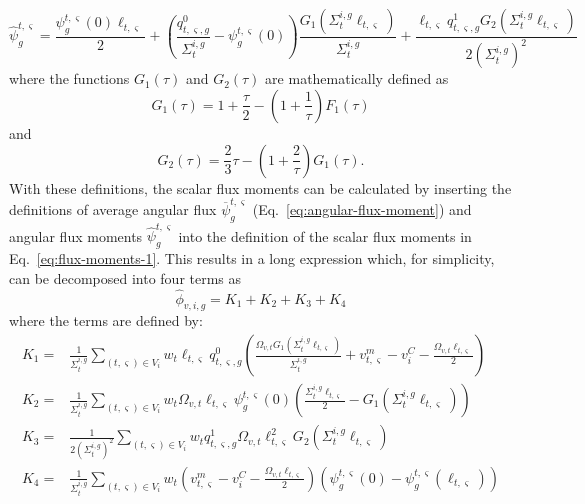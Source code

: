 \begin{equation}
\hat{\psi}^{t,\varsigma}_g = \frac{\psi^{t,\varsigma}_g(0) \ell_{t,\varsigma}}{2} + \left(\frac{q^0_{t,\varsigma,g}}{\Sigma_{t}^{i,g}} - \psi^{t,\varsigma}_g(0) \right) \frac{G_1(\Sigma_{t}^{i,g} \ell_{t,\varsigma})}{\Sigma_{t}^{i,g}} + \frac{\ell_{t,\varsigma} q^1_{t,\varsigma,g} G_2(\Sigma_{t}^{i,g} \ell_{t,\varsigma})}{2\left(\Sigma_{t}^{i,g}\right)^2}
\label{eq:angular-flux-moment}
\end{equation}
where the functions $G_1(\tau)$ and $G_2(\tau)$ are mathematically defined as
\begin{equation}
G_1(\tau) = 1 + \frac{\tau}{2} - \left(1 + \frac{1}{\tau}\right) F_1(\tau)
\end{equation}
and
\begin{equation}
G_2(\tau) = \frac{2}{3} \tau - \left(1 + \frac{2}{\tau}\right) G_1(\tau).
\end{equation}
With these definitions, the scalar flux moments can be calculated by inserting the definitions of average angular flux $\overline{\psi}^{t,\varsigma}_g$ (Eq.~\ref{eq:angular-flux-moment}) and angular flux moments $\hat{\psi}^{t,\varsigma}_g$ into the definition of the scalar flux moments in Eq.~\ref{eq:flux-moments-1}. This results in a long expression which, for simplicity, can be decomposed into four terms as
\begin{equation}
\hat{\phi}_{v,i,g} = K_1 + K_2 + K_3 + K_4
\end{equation}
where the terms are defined by:
\begin{align}
K_1 = & \frac{1}{\Sigma_{t}^{i,g}} \sum_{(t,\varsigma) \in V_i} w_t \ell_{t,\varsigma} q^0_{t,\varsigma,g} \left(\frac{\Omega_{v,t} G_1(\Sigma_{t}^{i,g} \ell_{t,\varsigma})}{\Sigma_{t}^{i,g}} +  v^m_{t,\varsigma} - v^C_i - \frac{\Omega_{v,t} \ell_{t,\varsigma}}{2} \right) \\
K_2 = & \frac{1}{\Sigma_{t}^{i,g}} \sum_{(t,\varsigma) \in V_i} w_t \Omega_{v,t} \ell_{t,\varsigma} \psi^{t,\varsigma}_g(0) \left(\frac{\Sigma_{t}^{i,g} \ell_{t,\varsigma}}{2} - G_1(\Sigma_{t}^{i,g} \ell_{t,\varsigma}) \right) \\
K_3 = & \frac{1}{2\left(\Sigma_{t}^{i,g}\right)^2} \sum_{(t,\varsigma) \in V_i} w_t q^1_{t,\varsigma,g} \Omega_{v,t} \ell_{t,\varsigma}^2 G_2(\Sigma_{t}^{i,g} \ell_{t,\varsigma}) \\
K_4 = & \frac{1}{\Sigma_{t}^{i,g}} \sum_{(t,\varsigma) \in V_i} w_t \left( v^m_{t,\varsigma} - v^C_i- \frac{\Omega_{v,t} \ell_{t,\varsigma}}{2} \right) \left(\psi^{t,\varsigma}_g(0) - \psi^{t,\varsigma}_g(\ell_{t,\varsigma}) \right)
\end{align}
